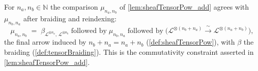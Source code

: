 \begin{lemma}
  \label{lem:tensorPowAdd_braiding}
  For \(n_a, n_b \in \mathbb{N}\) the comparison \(\mu_{n_a,n_b}\) of
  \cref{lem:sheafTensorPow_add} agrees with \(\mu_{n_b,n_a}\) after braiding and
  reindexing:
  \[
    \mu_{n_a,n_b}
      \;=\;
      \beta_{\mathcal{L}^{\otimes n_a},\,\mathcal{L}^{\otimes n_b}}
      \;\textrm{followed by}\;
      \mu_{n_b,n_a}
      \;\textrm{followed by}\;
      \bigl(\mathcal{L}^{\otimes (n_b+n_a)}
        \xrightarrow{\ \sim\ } \mathcal{L}^{\otimes (n_a+n_b)}\bigr),
  \]
  the final arrow induced by \(n_b + n_a = n_a + n_b\)
  (\cref{def:sheafTensorPow}), with \(\beta\) the braiding
  (\cref{def:tensorBraiding}). This is the commutativity constraint asserted in
  \cref{lem:sheafTensorPow_add}.
\end{lemma}

